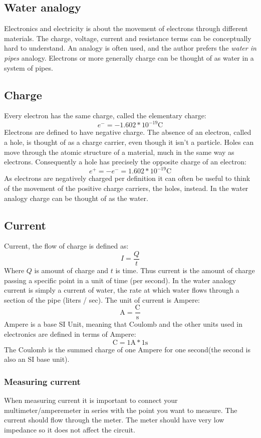 \subsection{Water analogy}
Electronics and electricity is about the movement of electrons through 
different materials. The charge, voltage, current and resistance terms 
can be conceptually hard to understand. An analogy is often used, and the 
author prefers the \emph{water in pipes} analogy. Electrons or more generally 
charge can be thought of as water in a system of pipes.
\subsection{Charge}
Every electron has the same charge, called the elementary charge:
\[ e^- = -1.602*10^{-19} \text{C} \]
Electrons are defined to have negative charge. The absence of an electron, 
called a hole, is thought of as a charge carrier, even though it isn't a 
particle. Holes can move through the atomic structure of a material, much in 
the same way as electrons. Consequently a hole has precisely the opposite 
charge of an electron:
\[ e^+ = -e^- = 1.602*10^{-19} \text{C}\]
As electrons are negatively charged per definition it can often be useful to 
think of the movement of the positive charge carriers, the holes, instead. In 
the water analogy charge can be thought of as the water.
\subsection{Current}
Current, the flow of charge is defined as:
\begin{equation}
    I = \frac{Q}{t}
\end{equation}
Where \(Q\) is amount of charge and \(t\) is time. Thus current is the amount 
of charge passing a specific point in a unit of time (per second). In the 
water analogy current is simply a current of water, the rate at which water 
flows through a section of the pipe (liters / sec). The unit of current is 
Ampere:
\[ \text{A} = \frac{\text{C}}{\text{s}} \]
Ampere is a base SI Unit, meaning that Coulomb and the other units used in 
electronics are defined in terms of Ampere:
\[ \text{C} = 1 \text{A} * 1 \text{s} \]
The Coulomb is the summed charge of one Ampere for one second(the second is 
also an SI base unit).
\subsubsection{Measuring current}
When measuring current it is important to connect your multimeter/amperemeter 
in series with the point you want to measure. The current should flow through 
the meter. The meter should have very low impedance so it does not affect the 
circuit.
